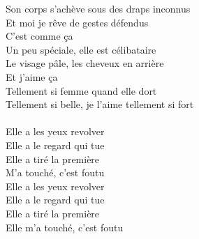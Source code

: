 Son corps s'achève sous des draps inconnus\\
Et moi je rêve de gestes défendus\\
C'est comme ça\\
Un peu spéciale, elle est célibataire\\
Le visage pâle, les cheveux en arrière\\
Et j'aime ça\\
Tellement si femme quand elle dort\\
Tellement si belle, je l'aime tellement si fort\\\\
Elle a les yeux revolver\\
Elle a le regard qui tue\\
Elle a tiré la première\\
M'a touché, c'est foutu\\
Elle a les yeux revolver\\
Elle a le regard qui tue\\
Elle a tiré la première\\
Elle m'a touché, c'est foutu\\
